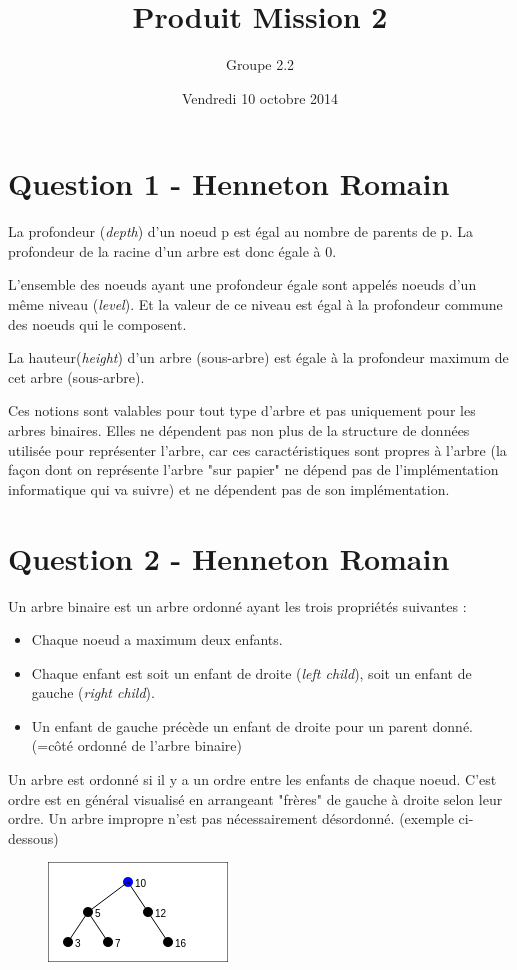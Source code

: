 \documentclass[10pt,a4paper]{article}
\date{Vendredi 10 octobre 2014}
\author{Groupe 2.2}
\title{Produit Mission 2 }
\begin{document}
\maketitle


\section*{Question 1 - Henneton Romain}

	La profondeur (\textit{depth}) d'un noeud p est égal au nombre de parents de p. La profondeur de la racine d'un arbre est donc égale à 0.
	
L'ensemble des noeuds ayant une profondeur égale sont appelés noeuds d'un même niveau (\textit{level}). Et la valeur de ce niveau est égal à la profondeur commune des noeuds qui le composent.

	La hauteur(\textit{height}) d'un arbre (sous-arbre) est égale à la profondeur maximum de cet arbre (sous-arbre).
	
	Ces notions sont valables pour tout type d'arbre et pas uniquement pour les arbres binaires. Elles ne dépendent pas non plus de la structure de données utilisée pour représenter l'arbre, car ces caractéristiques sont propres à l'arbre (la façon dont on représente l'arbre "sur papier" ne dépend pas de l'implémentation informatique qui va suivre) et ne dépendent pas de son implémentation.
	
\section*{Question 2 - Henneton Romain}
	Un arbre binaire est un arbre ordonné ayant les trois propriétés suivantes :
	
\begin{itemize}
\item Chaque noeud a maximum deux enfants.
\item Chaque enfant est soit un enfant de droite (\textit{left child}), soit un enfant de gauche (\textit{right child}).
\item Un enfant de gauche précède un enfant de droite pour un parent donné. (=côté ordonné de l'arbre binaire)
\end{itemize}

Un arbre est ordonné si il y a un ordre entre les enfants de chaque noeud. C'est ordre est en général visualisé en arrangeant "frères" de gauche à droite selon leur ordre. Un arbre impropre n'est pas nécessairement désordonné. (exemple ci-dessous)
\begin{figure}[!h]
\center
\includegraphics[scale=0.5]{q2impropre.png}
\end{figure}
\end{document}
